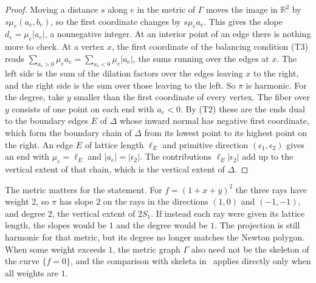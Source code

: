 \documentclass[12pt,letterpaper]{article}
\numberwithin{equation}{section}
\theoremstyle{definition}
\theoremstyle{remark}
\newcommand{\R}{\mathbb{R}}
\begin{document}
\begin{proof}
Moving a distance $s$ along $e$ in the metric of $\Gamma$ moves the image in
$\R^2$ by $s\mu_e(a_e,b_e)$, so the first coordinate changes by $s\mu_ea_e$.
This gives the slope $d_e=\mu_e|a_e|$, a nonnegative integer. At an interior
point of an edge there is nothing more to check. At a vertex $x$,
the first coordinate of the balancing condition (T3) reads
$\sum_{a_e>0}\mu_ea_e=\sum_{a_e<0}\mu_e|a_e|$, the sums running over the edges
at $x$. The left side is the sum of the dilation factors over the edges
leaving $x$ to the right, and the right side is the sum over those leaving to
the left. So $\pi$ is harmonic. For the degree, take $y$ smaller than the
first coordinate of every vertex. The fiber over $y$ consists of one point on
each end with $a_e<0$. By (T2) these are the ends dual to the boundary edges
$E$ of $\Delta$ whose inward normal has negative first coordinate, which form
the boundary chain of $\Delta$ from its lowest point to its highest point on
the right. An edge $E$ of lattice length $\ell_E$ and primitive direction
$(\epsilon_1,\epsilon_2)$ gives an end with $\mu_e=\ell_E$ and
$|a_e|=|\epsilon_2|$. The contributions $\ell_E|\epsilon_2|$ add up to the
vertical extent of that chain, which is the vertical extent of $\Delta$.
\end{proof}

The metric matters for the statement. For $f=(1+x+y)^2$ the three rays have
weight $2$, so $\pi$ has slope $2$ on the rays in the directions $(1,0)$ and
$(-1,-1)$, and degree $2$, the vertical extent of $2S_1$. If instead each ray
were given its lattice length, the slopes would be $1$ and the degree would be
$1$. The projection is still harmonic for that metric, but its degree no
longer matches the Newton polygon. When some weight exceeds $1$, the metric
graph $\Gamma$ also need not be the skeleton of the curve $\{f=0\}$, and the
comparison with skeleta in~\cite{ABBR15} applies directly only when all
weights are $1$.
\end{document}
